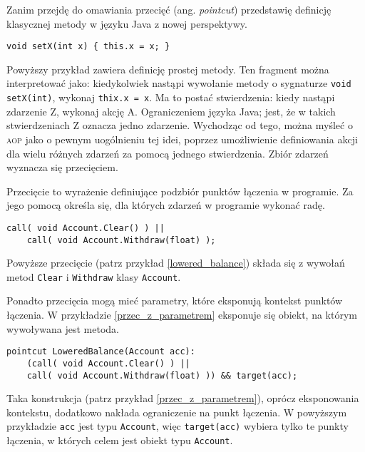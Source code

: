 \documentclass[a4paper,12pt]{mwbk}
\begin{document}
Zanim przejdę do omawiania przecięć (ang. \emph{pointcut}) przedstawię
definicję klasycznej metody w języku Java z nowej perspektywy.

\begin{lstlisting}[style=AspectJ]
void setX(int x) { this.x = x; }
\end{lstlisting}

Powyższy przykład zawiera definicję prostej metody. Ten fragment można
interpretować jako: kiedykolwiek nastąpi wywołanie metody o sygnaturze
\lstinline!void setX(int)!, wykonaj \lstinline!thix.x = x!.  Ma to postać
stwierdzenia: kiedy nastąpi zdarzenie Z, wykonaj akcję A.  Ograniczeniem języka
Java; jest, że w takich stwierdzeniach Z oznacza jedno zdarzenie.  Wychodząc od
tego, można myśleć o \textsc{aop} jako o pewnym uogólnieniu tej idei, poprzez
umożliwienie definiowania akcji dla wielu różnych zdarzeń za pomocą jednego
stwierdzenia. Zbiór zdarzeń wyznacza się przecięciem.

		
Przecięcie to wyrażenie definiujące podzbiór punktów łączenia w programie. Za
jego pomocą określa się, dla których zdarzeń w programie wykonać radę.

         
\begin{lstlisting}[style=AspectJ,caption=Przecięcie,label=lowered_balance]
    call( void Account.Clear() ) || 
    call( void Account.Withdraw(float) );
\end{lstlisting}
	

Powyższe przecięcie (patrz przykład \ref{lowered_balance}) składa się z wywołań
metod \lstinline^Clear^ i \lstinline^Withdraw^ klasy \lstinline^Account^.

Ponadto przecięcia mogą mieć parametry, które eksponują kontekst punktów
łączenia. W przykładzie \ref{przec_z_parametrem} eksponuje się obiekt, na
którym wywoływana jest metoda.

\begin{lstlisting}[style=AspectJ,caption=Przecięcie z parametrem,label=przec_z_parametrem]
pointcut LoweredBalance(Account acc): 
    (call( void Account.Clear() ) || 
    call( void Account.Withdraw(float) )) && target(acc);
\end{lstlisting}

Taka konstrukcja (patrz przykład \ref{przec_z_parametrem}), oprócz eksponowania
kontekstu, dodatkowo nakłada ograniczenie na punkt łączenia.  W powyższym
przykładzie \lstinline!acc! jest typu \lstinline!Account!, więc
\lstinline!target(acc)!  wybiera tylko te punkty łączenia, w których celem jest
obiekt typu \lstinline!Account!.
\end{document}
